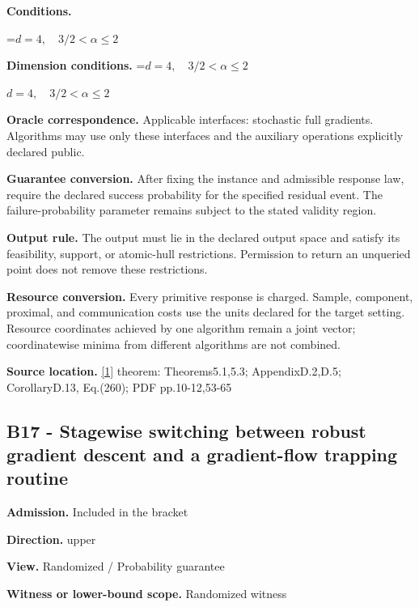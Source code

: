 \documentclass[10pt,a4paper]{article}
\newcommand{\AtlasMath}[1]{\par\begingroup\centering\setbox0=\hbox{$\displaystyle #1$}\ifdim\wd0>1.4\linewidth\typeout{ATLAS WIDE FORMULA: \the\wd0}\fi\ifdim\wd0>\linewidth\resizebox{\linewidth}{!}{\box0}\else\box0\fi\par\endgroup}
\newcommand{\AtlasInlineMath}[1]{\begingroup\setbox0=\hbox{$#1$}\ifdim\wd0>.4\linewidth\endgroup\AtlasMath{#1}\else\endgroup$#1$\fi}
\begin{document}
\textbf{Conditions.}
\AtlasMath{d=4,\quad 3/2<\alpha\le2}




\textbf{Dimension conditions.} \AtlasInlineMath{d=4,\quad 3/2<\alpha\le2}



\textbf{Oracle correspondence.} Applicable interfaces: stochastic full gradients. Algorithms may use only these interfaces and the auxiliary operations explicitly declared public.



\textbf{Guarantee conversion.} After fixing the instance and admissible response law, require the declared success probability for the specified residual event. The failure-probability parameter remains subject to the stated validity region.



\textbf{Output rule.} The output must lie in the declared output space and satisfy its feasibility, support, or atomic-hull restrictions. Permission to return an unqueried point does not remove these restrictions.



\textbf{Resource conversion.} Every primitive response is charged. Sample, component, proximal, and communication costs use the units declared for the target setting. Resource coordinates achieved by one algorithm remain a joint vector; coordinatewise minima from different algorithms are not combined.



\textbf{Source location.} \href{https://arxiv.org/pdf/2609.03990}{[1]} theorem: Theorems5.1,5.3; AppendixD.2,D.5; CorollaryD.13, Eq.(260); PDF pp.10-12,53-65



\subsection{B17 - Stagewise switching between robust gradient descent and a gradient-flow trapping routine}


\textbf{Admission.} Included in the bracket



\textbf{Direction.} upper



\textbf{View.} Randomized / Probability guarantee



\textbf{Witness or lower-bound scope.} Randomized witness
\end{document}
